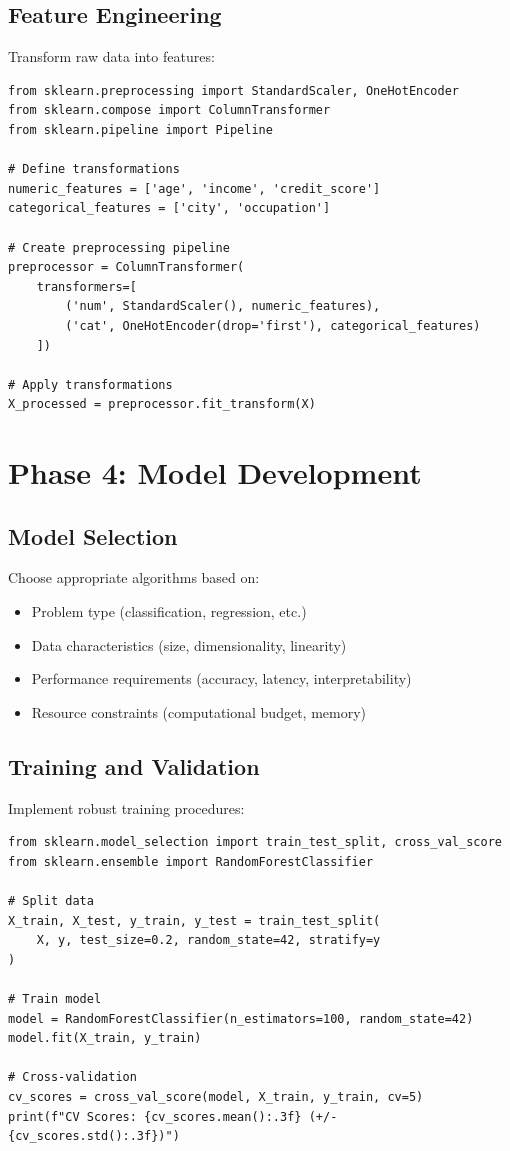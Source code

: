 \subsection{Feature Engineering}

Transform raw data into features:

\begin{lstlisting}[style=python]
from sklearn.preprocessing import StandardScaler, OneHotEncoder
from sklearn.compose import ColumnTransformer
from sklearn.pipeline import Pipeline

# Define transformations
numeric_features = ['age', 'income', 'credit_score']
categorical_features = ['city', 'occupation']

# Create preprocessing pipeline
preprocessor = ColumnTransformer(
    transformers=[
        ('num', StandardScaler(), numeric_features),
        ('cat', OneHotEncoder(drop='first'), categorical_features)
    ])

# Apply transformations
X_processed = preprocessor.fit_transform(X)
\end{lstlisting}

\section{Phase 4: Model Development}

\subsection{Model Selection}

Choose appropriate algorithms based on:

\begin{itemize}
    \item Problem type (classification, regression, etc.)
    \item Data characteristics (size, dimensionality, linearity)
    \item Performance requirements (accuracy, latency, interpretability)
    \item Resource constraints (computational budget, memory)
\end{itemize}

\subsection{Training and Validation}

Implement robust training procedures:

\begin{lstlisting}[style=python]
from sklearn.model_selection import train_test_split, cross_val_score
from sklearn.ensemble import RandomForestClassifier

# Split data
X_train, X_test, y_train, y_test = train_test_split(
    X, y, test_size=0.2, random_state=42, stratify=y
)

# Train model
model = RandomForestClassifier(n_estimators=100, random_state=42)
model.fit(X_train, y_train)

# Cross-validation
cv_scores = cross_val_score(model, X_train, y_train, cv=5)
print(f"CV Scores: {cv_scores.mean():.3f} (+/- {cv_scores.std():.3f})")
\end{lstlisting}

